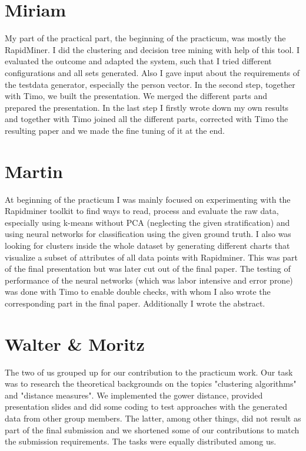 \documentclass{article}
\begin{document}
	
\section{Miriam}
My part of the practical part, the beginning of the practicum, was mostly the RapidMiner. I did the clustering and decision tree  mining with help of this tool. I evaluated the outcome and adapted the system, such that I tried different configurations and all sets generated. Also I gave input about the requirements of the testdata generator, especially the person vector. In the second step, together with Timo, we built the presentation. We merged the different parts and prepared the presentation. In the last step I firstly wrote down my own results and together with Timo joined all the different parts, corrected with Timo the resulting paper and we made the fine tuning of it at the end.

\section{Martin}
At beginning of the practicum I was mainly focused on experimenting with the Rapidminer toolkit to find ways to read, process and evaluate the raw data, especially using k-means without PCA (neglecting the given stratification) and using neural networks for classification using the given ground truth. I also was looking for clusters inside the whole dataset by generating different charts that visualize a subset of attributes of all data points with Rapidminer. This was part of the final presentation but was later cut out of the final paper. The testing of performance of the neural networks (which was labor intensive and error prone) was done with Timo to enable double checks, with whom I also wrote the corresponding part in the final paper. Additionally I wrote the abstract.

\section{Walter \& Moritz}

The two of us grouped up for our contribution to the practicum work. Our task was to research the theoretical backgrounds on the topics "clustering algorithms" and "distance measures". We implemented the gower distance, provided presentation slides and did some coding to test approaches with the generated data from other group members. The latter, among other things, did not result as part of the final submission and we shortened some of our contributions to match the submission requirements. The tasks were equally distributed among us.
\end{document}
